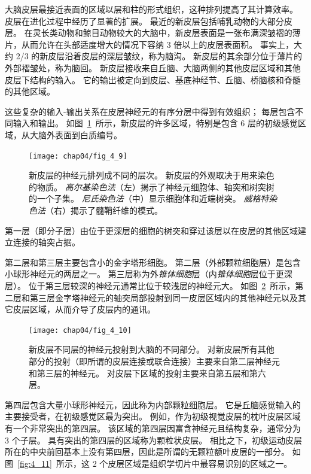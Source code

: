 大脑皮层最接近表面的区域以层和柱的形式组织，这种排列提高了其计算效率。 
皮层在进化过程中经历了显著的扩展。 
最近的新皮层包括哺乳动物的大部分皮层。 
在灵长类动物和鲸目动物较大的大脑中，新皮层表面是一张布满深皱褶的薄片，从而允许在头部适度增大的情况下容纳 3 倍以上的皮层表面积。
事实上，大约 2/3 的新皮层沿着皮层的深层皱纹，称为脑沟。
新皮层的其余部分位于薄片的外部褶皱处，称为脑回。 
新皮层接收来自丘脑、大脑两侧的其他皮层区域和其他皮层下结构的输入。 
它的输出被定向到皮层、基底神经节、丘脑、桥脑核和脊髓的其他区域。


这些复杂的输入-输出关系在皮层神经元的有序分层中得到有效组织；
每层包含不同输入和输出。
如图~\ref{fig:4_9}~所示，新皮层的许多区域，特别是包含 6 层的初级感觉区域，从大脑外表面到白质编号。

\begin{figure}[htbp]
	\centering
	\texttt{[image: chap04/fig\_4\_9]}
	\caption{新皮层的神经元排列成不同的层次。 
		新皮层的外观取决于用来染色的物质。 
		\textit{高尔基染色法}（左）揭示了神经元细胞体、轴突和树突树的一个子集。 
		\textit{尼氏染色法}（中）显示细胞体和近端树突。
		\textit{威格特染色法}（右）揭示了髓鞘纤维的模式\cite{heimer2012human}。}
	\label{fig:4_9}
\end{figure}


第一层（即分子层）由位于更深层的细胞的树突和穿过该层以在皮层的其他区域建立连接的轴突占据。


第二层和第三层主要包含小的金字塔形细胞。
第二层（外部颗粒细胞层）是包含小球形神经元的两层之一。
第三层称为外\textit{锥体细胞}层（内\textit{锥体细胞}层位于更深层）。
位于第三层较深的神经元通常比位于较浅层的神经元大。 
如图~\ref{fig:4_10}~所示，第二层和第三层金字塔神经元的轴突局部投射到同一皮层区域内的其他神经元以及其它皮层区域，从而介导了皮层内的通讯。

\begin{figure}[htbp]
	\centering
	\texttt{[image: chap04/fig\_4\_10]}
	\caption{新皮层不同层的神经元投射到大脑的不同部分。
		对新皮层所有其他部分的投射（即所谓的皮层连接或联合连接）主要来自第二层神经元和第三层的神经元。
		对皮层下区域的投射主要来自第五层和第六层\cite{jones1986connectivity}。}
	\label{fig:4_10}
\end{figure}


第四层包含大量小球形神经元，因此称为内部颗粒细胞层。 
它是丘脑感觉输入的主要接受者，在初级感觉区最为突出。 
例如，作为初级视觉皮层的枕叶皮层区域有一个非常突出的第四层。
该区域的第四层因富含神经元且结构复杂，通常分为 3 个子层。
具有突出的第四层的区域称为颗粒状皮层。 
相比之下，初级运动皮层所在的中央前回基本上没有第四层，因此是所谓的无颗粒额叶皮层的一部分。
如图~\ref{fig:4_11}~所示，这 2 个皮层区域是组织学切片中最容易识别的区域之一。

